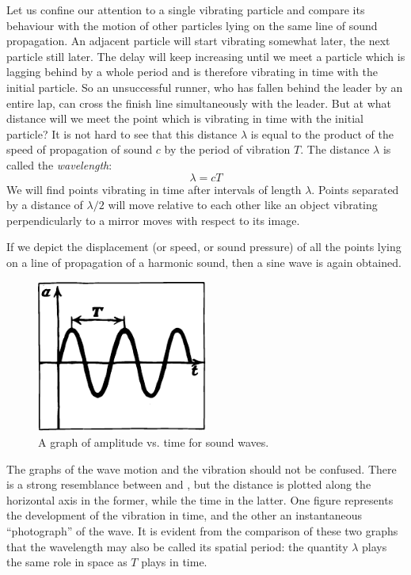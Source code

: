 Let us confine our attention to a single vibrating par­ticle and compare its behaviour with the motion of other particles lying on the same line of sound propagation. An adjacent particle will start vibrating somewhat later, the next particle still later. The delay will keep increasing until we meet a particle which is lagging behind by a whole period and is therefore vibrating in time with the initial particle. So an unsuccessful runner, who has fallen behind the leader by an entire lap, can cross the finish line simultaneously with the leader. But at what distance will we meet the point which is vibrating in time with the initial particle? It is not hard to see that this distance $\lambda$ is equal to the product of the speed of propagation of sound $c$ by the period of vibration $T$. The distance $\lambda$ is called the \emph{wavelength}:
\begin{equation*}%
\lambda = c T
\end{equation*}
We will find points vibrating in time after intervals of length $\lambda$. Points separated by a distance of $\lambda/2$ will move relative to each other like an object vibrating perpendic­ularly to a mirror moves with respect to its image.

If we depict the displacement (or speed, or sound pres­sure) of all the points lying on a line of propagation of a harmonic sound, then a sine wave is again obtained.

\begin{figure}[!ht]
\centering
\includegraphics[width=0.5\textwidth]{figures/fig-06-11.pdf}
\caption{A graph of amplitude vs. time for sound waves.}
\label{fig-6.11}
\end{figure}

The graphs of the wave motion and the vibration should not be confused. There is a strong resemblance between  and , but the distance is plotted along the horizontal axis in the former, while the time in the latter. One figure represents the development of the vibration in time, and the other an instantaneous ``photograph'' of the wave. It is evident from the comparison of these two graphs that the wavelength may also be called its spatial period: the quantity $\lambda$ plays the same role in space as $T$ plays in time.

